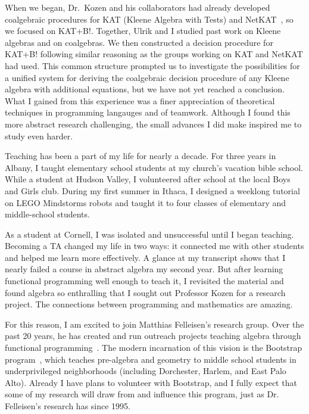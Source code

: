 \documentclass[12pt]{article}
\newcommand{\hdr}[2]{\vspace{-0.4cm}{\flushleft{\hrulefill\\\textbf{#1}\hfill{#2}\\\vspace{-0.2cm}\hrulefill}}\vspace{0.1cm}}
\begin{document}
When we began, Dr.~Kozen and his collaborators had already developed coalgebraic procedures for KAT (Kleene Algebra with Tests) and NetKAT~\cite{foster2014coalgebraic}, so we focused on KAT+B!.
Together, Ulrik and I studied past work on Kleene algebras and on coalgebras.
We then constructed a decision procedure for KAT+B! following similar reasoning as the groups working on KAT and NetKAT had used.
This common structure prompted us to investigate the possibilities for a unified system for deriving the coalgebraic decision procedure of any Kleene algebra with additional equations, but we have not yet reached a conclusion.
What I gained from this experience was a finer appreciation of theoretical techniques in programming langauges and of teamwork.
Although I found this more abstract research challenging, the small advances I did make inspired me to study even harder.

\hdr{Broader Impacts}{}

Teaching has been a part of my life for nearly a decade.
For three years in Albany, I taught elementary school students at my church's vacation bible school.
While a student at Hudson Valley, I volunteered after school at the local Boys and Girls club.
During my first summer in Ithaca, I designed a weeklong tutorial on LEGO Mindstorms robots and taught it to four classes of elementary and middle-school students.

As a student at Cornell, I was isolated and unsuccessful until I began teaching.
Becoming a TA changed my life in two ways: it connected me with other students and helped me learn more effectively.
A glance at my transcript shows that I nearly failed a course in abstract algebra my second year.
But after learning functional programming well enough to teach it, I revisited the material and found algebra so enthralling that I sought out Professor Kozen for a research project.
The connections between programming and mathematics are amazing.

For this reason, I am excited to join Matthias Felleisen's research group.
Over the past 20 years, he has created and run outreach projects teaching algebra through functional programming~\cite{felleisen2010teachscheme}.
The modern incarnation of this vision is the Bootstrap program~\cite{bootstrap}, which teaches pre-algebra and geometry to middle school students in underprivileged neighborhoods (including Dorchester, Harlem, and East Palo Alto).
Already I have plans to volunteer with Bootstrap, and I fully expect that some of my research will draw from and influence this program, just as Dr. Felleisen's research has since 1995.

\vfill
\renewcommand{\section}[2]{}
\footnotesize


\end{document}
